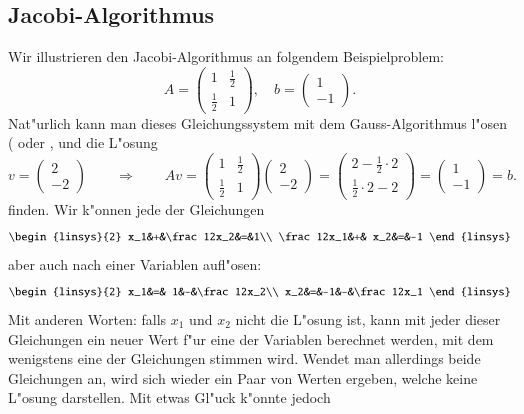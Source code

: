 \subsection{Jacobi-Algorithmus}
Wir illustrieren den Jacobi-Algorithmus an folgendem Beispielproblem:
\begin{equation}
A=\begin{pmatrix}1&\frac12\\\frac12&1\end{pmatrix},\quad
b=\begin{pmatrix}1\\-1\end{pmatrix}.
\label{jacobi-beispiel}
\end{equation}
Nat"urlich kann man dieses Gleichungssystem mit dem Gauss-Algorithmus
l"osen (\cite[Kapitel 1]{skript:linalg} oder \cite[Chapter 1]{skript:watkins},
und die L"osung
\[
v=\begin{pmatrix}2\\-2\end{pmatrix}\qquad\Rightarrow\qquad
Av=
\begin{pmatrix}1&\frac12\\\frac12&1\end{pmatrix}
\begin{pmatrix}2\\-2\end{pmatrix}
=
\begin{pmatrix}2-\frac12\cdot 2\\\frac12\cdot 2-2\end{pmatrix}
=
\begin{pmatrix}1\\-1\end{pmatrix}=b.
\]
finden. Wir k"onnen jede der Gleichungen 
\[
\begin{linsys}{2}
       x_1&+&\frac12x_2&=&1\\
\frac12x_1&+&       x_2&=&-1
\end{linsys}
\]
aber auch nach einer Variablen aufl"osen:
\[
\begin{linsys}{2}
x_1&=& 1&-&\frac12x_2\\
x_2&=&-1&-&\frac12x_1
\end{linsys}
\]
Mit anderen Worten: falls $x_1$ und $x_2$
nicht die L"osung ist, kann mit jeder dieser Gleichungen ein neuer
Wert f"ur eine der Variablen berechnet werden, mit dem wenigstens
eine der Gleichungen stimmen wird.
Wendet man allerdings beide
Gleichungen an, wird sich wieder ein Paar von Werten ergeben,
welche keine L"osung darstellen. Mit etwas Gl"uck k"onnte jedoch
